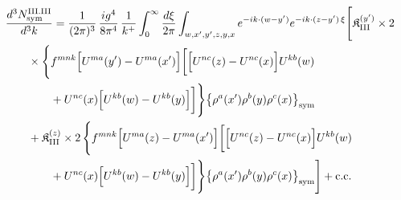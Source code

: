 \begingroup\small
\begin{align}\label{eq:H-III.III-3}
&\frac{d^{3}N^{\rm III.III}_{{\rm sym}}}{d^{3}k}=\frac{1}{(2\pi)^{3}}\, \frac{ig^{4}}{8\pi^{4}}\, \frac{1}{k^{+}} \int_{0}^{\infty}\frac{d\xi}{2\pi} \int_{w,x',y',z,y,x}e^{-ik\cdot(w-y')}e^{-ik\cdot(z-y')\,\xi}\Bigg[ \mathfrak{K}^{(y')}_{\rm III} \times 2\notag\\
&\quad\quad \times \Bigg\{f^{mnk}\Big[U^{ma}(y')-U^{ma}(x')\Big]\bigg[\Big[U^{nc}(z)-U^{nc}(x)\Big]U^{kb}(w)\notag\\
&\quad\quad\quad\quad +U^{nc}(x)\Big[U^{kb}(w)-U^{kb}(y)\Big]\bigg] \Bigg\}\big\{\rho^{a}(x')\rho^{b}(y)\rho^{c}(x)\big\}_{\rm sym}\notag\\
&\quad\quad + \mathfrak{K}^{(z)}_{\rm III} \times 2\, \Bigg\{f^{mnk}\Big[U^{ma}(z)-U^{ma}(x')\Big]\bigg[\Big[U^{nc}(z)-U^{nc}(x)\Big]U^{kb}(w)\notag\\
&\quad\quad\quad\quad +U^{nc}(x)\Big[U^{kb}(w)-U^{kb}(y)\Big]\bigg] \Bigg\}\big\{\rho^{a}(x')\rho^{b}(y)\rho^{c}(x)\big\}_{\rm sym}\Bigg] +{\rm c.c.}
\end{align}
\endgroup
